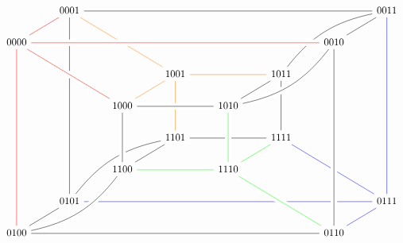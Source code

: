 \usepackage{tikz-cd}


\[\begin{tikzcd}
        & 0001 \ar[rrrrrr, dash] \ar[dddddd, dash] \ar[ddrr, dash, orange] &&&&&& 0011 \ar[dddddd, dash, blue] \ar[lldd, dash, bend right=20] \\
        0000 \ar[ddrr, dash, crossing over, red] \ar[rrrrrr, dash, crossing over, red] \ar[dddddd, dash, red] \ar[ru, dash, red] &&&&&& 0010 \ar[ru, dash] \\
        &&& 1001 \ar[rr, dash, orange] \ar[dd, dash, orange] && 1011 \ar[dd, dash] \\
        && 1000 \ar[rr, dash, crossing over] \ar[ru, dash, orange] && 1010 \ar[ru, dash] \ar[uurr, dash, bend right=20, crossing over] \\
        &&& 1101 \ar[rr, dash] \ar[ddll, dash, bend right=20] && 1111 \ar[dl, dash, green] \\
        && 1100 \ar[uu, dash, crossing over] \ar[ur, dash] \ar[rr, dash, green] && 1110 \ar[uu, dash, crossing over, green] \\
        & 0101 \ar[rrrrrr, dash, blue] &&&&&& 0111 \ar[dl, dash, blue] \ar[lluu, dash, blue] \\
        0100 \ar[ur, dash] \ar[uurr, dash, bend right=20, crossing over] \ar[rrrrrr, dash] &&&&&& 0110 \ar[uull, dash, crossing over, green] \ar[uuuuuu, dash, crossing over]
\end{tikzcd}\]

